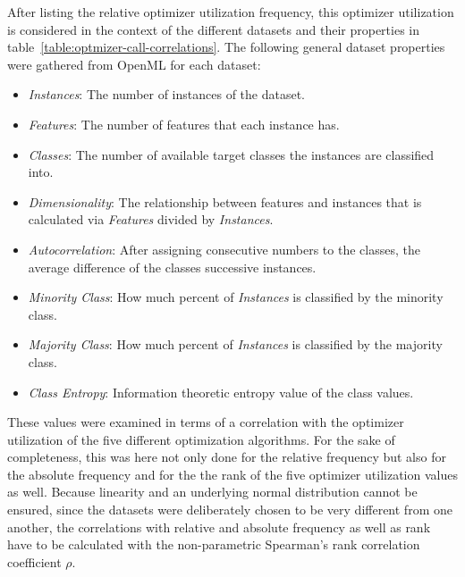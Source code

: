 After listing the relative optimizer utilization frequency, this optimizer utilization is considered in the context of the different datasets and their properties in table~\ref{table:optmizer-call-correlations}.
The following general dataset properties were gathered from OpenML for each dataset:
\begin{itemize}
    \item \textit{Instances}: The number of instances of the dataset.
    \item \textit{Features}: The number of features that each instance has.
    \item \textit{Classes}: The number of available target classes the instances are classified into.
    \item \textit{Dimensionality}: The relationship between features and instances that is calculated via \textit{Features} divided by \textit{Instances}.
    \item \textit{Autocorrelation}: After assigning consecutive numbers to the classes, the average difference of the classes successive instances.
    \item \textit{Minority Class}: How much percent of \textit{Instances} is classified by the minority class.
    \item \textit{Majority Class}: How much percent of \textit{Instances} is classified by the majority class.
    \item \textit{Class Entropy}: Information theoretic entropy value of the class values.
\end{itemize}
These values were examined in terms of a correlation with the optimizer utilization of the five different optimization algorithms.
For the sake of completeness, this was here not only done for the relative frequency but also for the absolute frequency and for the the rank of the five optimizer utilization values as well.\newline
Because linearity and an underlying normal distribution cannot be ensured, since the datasets were deliberately chosen to be very different from one another, the correlations with relative and absolute frequency as well as rank have to be calculated with the non-parametric Spearman's rank correlation coefficient $\rho$.

